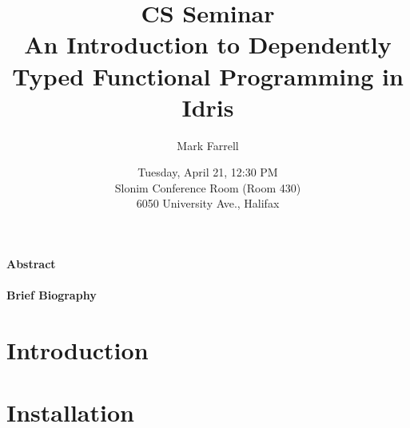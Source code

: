 \documentclass[twocolumn, 10pt, english]{article}
\title{
  \large CS Seminar \\
  \normalsize An Introduction to Dependently Typed Functional Programming in Idris
}
\date{
  \normalsize
  Tuesday, April 21, 12:30 PM \\
  Slonim Conference Room (Room 430) \\
  6050 University Ave., Halifax
}
\author{\normalsize Mark Farrell}
\begin{document}
\maketitle
\thispagestyle{empty}

\paragraph{Abstract}











\paragraph{Brief Biography}



\newpage

\section{Introduction}



\section{Installation}


\newpage



\end{document}
